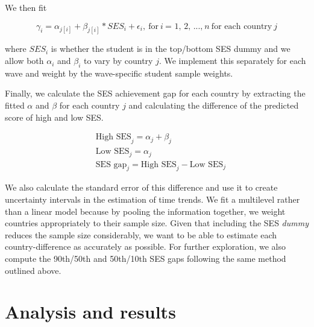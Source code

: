 \documentclass[11pt, a4paper]{article}\usepackage[]{graphicx}\usepackage[]{color}
\begin{document}
We then fit

\begin{equation}
\gamma_i = \alpha_{j[i]} + \beta_{j[i]} * SES_i + \epsilon_i,\ \text{for} \ i \ \text{= 1, 2, ...,} \ n \ \text{for each country} \ j
\end{equation}



where \(SES_i\) is whether the student is in the top/bottom SES dummy and we allow both \(\alpha_i\) and \(\beta_i\) to vary by country \(j\). We implement this separately for each wave and weight by the wave-specific student sample weights.

Finally, we calculate the SES achievement gap for each country by extracting the fitted \(\alpha\) and \(\beta\) for each country \(j\) and calculating the difference of the predicted score of high and low SES.

\begin{equation}
\begin{split}
\quad \text{High SES}_j = \alpha_j + \beta_j \\
\quad \text{Low SES}_j = \alpha_j \\
\quad \text{SES gap}_j = \text{High SES}_j - \text{Low SES}_j
\end{split}
\end{equation}

We also calculate the standard error of this difference and use it to create uncertainty intervals in the estimation of time trends. We fit a multilevel rather than a linear model because by pooling the information together, we weight countries appropriately to their sample size. Given that including the SES \emph{dummy} reduces the sample size considerably, we want to be able to estimate each country-difference as accurately as possible. For further exploration, we also compute the 90th/50th and 50th/10th SES gaps following the same method outlined above.

\section{Analysis and results}
\end{document}
